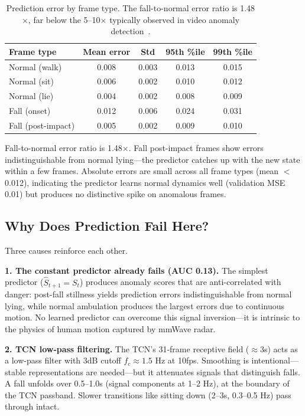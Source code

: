 \documentclass[11pt,a4paper]{article}
\begin{document}
\begin{table}[H]
\centering
\caption{Prediction error by frame type. The fall-to-normal error ratio is 1.48$\times$, far below the 5--10$\times$ typically observed in video anomaly detection~\cite{liu2018future}.}
\label{tab:pred_error}
\begin{tabular}{lcccc}
\toprule
\textbf{Frame type} & \textbf{Mean error} & \textbf{Std} & \textbf{95th \%ile} & \textbf{99th \%ile} \\
\midrule
Normal (walk)        & 0.008 & 0.003 & 0.013 & 0.015 \\
Normal (sit)         & 0.006 & 0.002 & 0.010 & 0.012 \\
Normal (lie)         & 0.004 & 0.002 & 0.008 & 0.009 \\
Fall (onset)         & 0.012 & 0.006 & 0.024 & 0.031 \\
Fall (post-impact)   & 0.005 & 0.002 & 0.009 & 0.010 \\
\bottomrule
\end{tabular}
\end{table}

Fall-to-normal error ratio is 1.48$\times$.
Fall post-impact frames show errors indistinguishable from normal lying---the predictor catches up with the new state within a few frames.
Absolute errors are small across all frame types (mean $<$0.012), indicating the predictor learns normal dynamics well (validation MSE 0.01) but produces no distinctive spike on anomalous frames.

\subsection{Why Does Prediction Fail Here?}

Three causes reinforce each other.

\textbf{1. The constant predictor already fails (AUC 0.13).}
The simplest predictor ($\hat{S}_{t+1}=S_t$) produces anomaly scores that are anti-correlated with danger: post-fall stillness yields prediction errors indistinguishable from normal lying, while normal ambulation produces the largest errors due to continuous motion.
No learned predictor can overcome this signal inversion---it is intrinsic to the physics of human motion captured by mmWave radar.

\textbf{2. TCN low-pass filtering.}
The TCN's 31-frame receptive field ($\approx$3s) acts as a low-pass filter with 3dB cutoff $f_c \approx 1.5$ Hz at 10fps.
Smoothing is intentional---stable representations are needed---but it attenuates signals that distinguish falls.
A fall unfolds over 0.5--1.0s (signal components at 1--2 Hz), at the boundary of the TCN passband.
Slower transitions like sitting down (2--3s, 0.3--0.5 Hz) pass through intact.
\end{document}
